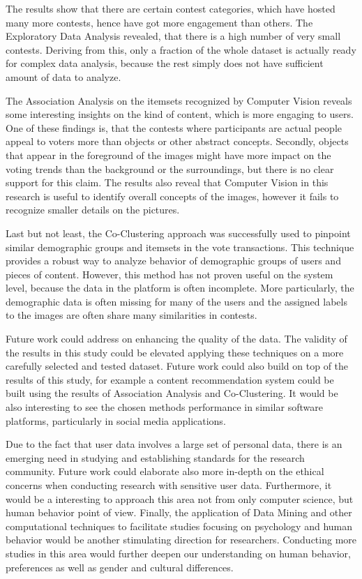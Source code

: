 The results show that there are certain contest categories, which have hosted many more contests, hence have got more engagement than others. The Exploratory Data Analysis revealed, that there is a high number of very small contests. Deriving from this, only a fraction of the whole dataset is actually ready for complex data analysis, because the rest simply does not have sufficient amount of data to analyze. 

The Association Analysis on the itemsets recognized by Computer Vision reveals some interesting insights on the kind of content, which is more engaging to users. One of these findings is, that the contests where participants are actual people appeal to voters more than objects or other abstract concepts. Secondly, objects that appear in the foreground of the images might have more impact on the voting trends than the background or the surroundings, but there is no clear support for this claim. The results also reveal that Computer Vision in this research is useful to identify overall concepts of the images, however it fails to recognize smaller details on the pictures. 

Last but not least, the Co-Clustering approach was successfully used to pinpoint similar demographic groups and itemsets in the vote transactions. This technique provides a robust way to analyze behavior of demographic groups of users and pieces of content. However, this method has not proven useful on the system level, because the data in the platform is often incomplete. More particularly, the demographic data is often missing for many of the users and the assigned labels to the images are often share many similarities in contests. 

Future work could address on enhancing the quality of the data. The validity of the results in this study could be elevated applying these techniques on a more carefully selected and tested dataset. Future work could also build on top of the results of this study, for example a content recommendation system could be built using the results of Association Analysis and Co-Clustering. It would be also interesting to see the chosen methods performance in similar software platforms, particularly in social media applications. 

Due to the fact that user data involves a large set of personal data, there is an emerging need in studying and establishing standards for the research community. Future work could elaborate also more in-depth on the ethical concerns when conducting research with sensitive user data. Furthermore, it would be a interesting to approach this area not from only computer science, but human behavior point of view. Finally, the application of Data Mining and other computational techniques to facilitate studies focusing on psychology and human behavior would be another stimulating direction for researchers. Conducting more studies in this area would further deepen our understanding on human behavior, preferences as well as gender and cultural differences. 